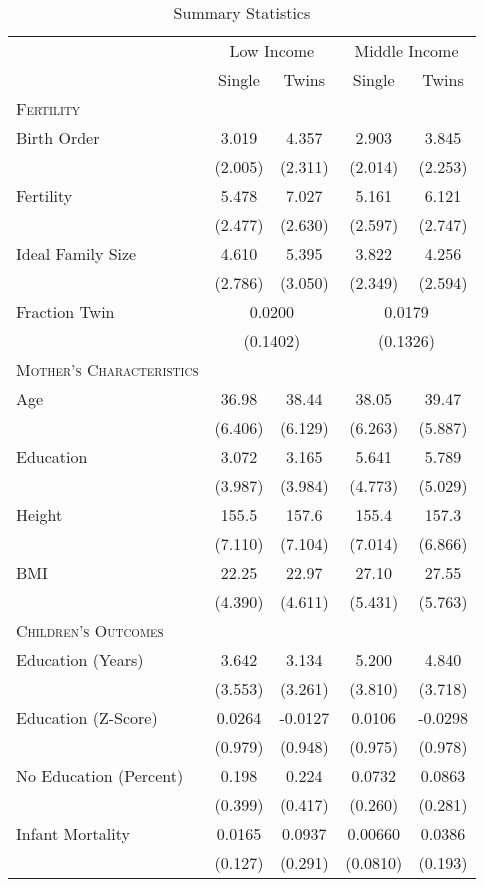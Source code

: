\begin{table}[htpb!]\caption{Summary Statistics} 
\label{TWINtab:sumstats}\begin{center}\begin{tabular}{lcccc}
\toprule \toprule 
&\multicolumn{2}{c}{Low Income}&\multicolumn{2}{c}{Middle Income}\\ 
\cmidrule(r){2-3} \cmidrule(r){4-5}
& Single & Twins & Single & Twins\\ \midrule 
\textsc{Fertility} & & & & \\ 
Birth Order&3.019&4.357&2.903&3.845\\
&(2.005)&(2.311)&(2.014)&(2.253)\\
Fertility&5.478&7.027&5.161&6.121\\
&(2.477)&(2.630)&(2.597)&(2.747)\\
Ideal Family Size&4.610&5.395&3.822&4.256\\
&(2.786)&(3.050)&(2.349)&(2.594)\\
Fraction Twin & \multicolumn{2}{c}{  0.0200}& \multicolumn{2}{c}{  0.0179 }\\
& \multicolumn{2}{c}{(0.1402)}& \multicolumn{2}{c}{(0.1326)}\\
\textsc{Mother's Characteristics}&&&&\\ Age
&36.98&38.44&38.05&39.47\\
&(6.406)&(6.129)&(6.263)&(5.887)\\
Education&3.072&3.165&5.641&5.789\\
&(3.987)&(3.984)&(4.773)&(5.029)\\
Height&155.5&157.6&155.4&157.3\\
&(7.110)&(7.104)&(7.014)&(6.866)\\
BMI&22.25&22.97&27.10&27.55\\
&(4.390)&(4.611)&(5.431)&(5.763)\\
\textsc{Children's Outcomes}&&&&\\ Education (Years)
&3.642&3.134&5.200&4.840\\
&(3.553)&(3.261)&(3.810)&(3.718)\\
Education (Z-Score)&0.0264&-0.0127&0.0106&-0.0298\\
&(0.979)&(0.948)&(0.975)&(0.978)\\
No Education (Percent)&0.198&0.224&0.0732&0.0863\\
&(0.399)&(0.417)&(0.260)&(0.281)\\
Infant Mortality&0.0165&0.0937&0.00660&0.0386\\
&(0.127)&(0.291)&(0.0810)&(0.193)\\

\end{tabular}
\end{center}
\end{table}
